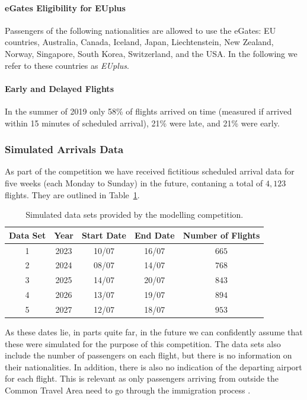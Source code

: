 \documentclass[10pt]{article}
\begin{document}
\paragraph{eGates Eligibility for EUplus}
Passengers of the following nationalities are allowed to use the eGates: EU countries, Australia, Canada, Iceland, Japan, Liechtenstein, New Zealand, Norway, Singapore, South Korea, Switzerland, and the USA. In the following we refer to these countries as \textit{EUplus}. 

\paragraph{Early and Delayed Flights}
In the summer of 2019 only 58\% of flights arrived on time (measured if arrived within 15 minutes of scheduled arrival), 21\% were late, and 21\% were early. 

\subsubsection{Simulated Arrivals Data}
As part of the competition we have received fictitious scheduled arrival data for five weeks (each Monday to Sunday) in the future, contaning a total of $4,123$ flights. They are outlined in Table~\ref{tab_comdat_overview}.


\begin{table}[!ht]
\caption{Simulated data sets provided by the modelling competition.}
\label{tab_comdat_overview}
\centering
\begin{tabular}{ccccc}
\hline
\multicolumn{1}{c}{\textbf{Data Set}} & \textbf{Year} & \textbf{Start Date} & \textbf{End Date} & \textbf{Number of Flights} \\ \hline
1  & 2023  & 10/07  & 16/07     & $665$   \\
2  & 2024  & 08/07  & 14/07     & $768$   \\
3  & 2025  & 14/07  & 20/07     & $843$   \\
4  & 2026  & 13/07  & 19/07     & $894$   \\
5  & 2027  & 12/07  & 18/07     & $953$   \\ \hline
\end{tabular}
\end{table}

As these dates lie, in parts quite far, in the future we can confidently assume that these were simulated for the purpose of this competition. The data sets also include the number of passengers on each flight, but there is no information on their nationalities. In addition, there is also no indication of the departing airport for each flight. This is relevant as only passengers arriving from outside the Common Travel Area need to go through the immigration process \cite{common_travel_area}.
\end{document}
